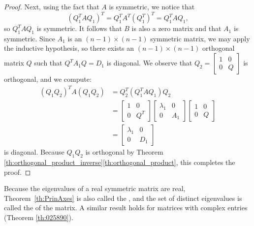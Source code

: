 \documentclass{ximera}
\begin{document}
\begin{proof}
Next, using the fact that $A$ is symmetric, we notice that
$$(Q_{1}^TAQ_{1})^T = Q_{1}^T A^T (Q_{1}^T)^T = Q_{1}^TAQ_{1},$$ so $Q_{1}^TAQ_{1}$ is symmetric.  It follows that $B$ is also a zero matrix and that $A_{1}$ is symmetric.  Since $A_{1}$ is an $(n - 1) \times (n - 1)$ symmetric matrix, we may apply the inductive hypothesis, so there exists an $(n - 1) \times (n - 1)$ orthogonal matrix $Q$ such that $Q^{T}A_{1}Q = D_{1}$ is diagonal. We observe that $Q_{2} = \begin{bmatrix}
 1 & 0\\
 0 & Q
 \end{bmatrix}$
 is orthogonal, and we compute:
\begin{align*}
(Q_{1}Q_{2})^TA(Q_{1}Q_{2}) &= Q_{2}^T(Q_{1}^TAQ_{1})Q_{2} \\
&= \begin{bmatrix}
1 & 0 \\
0 & Q^T
\end{bmatrix} \begin{bmatrix}
\lambda_{1} & 0 \\
0 & A_{1}
\end{bmatrix}\begin{bmatrix}
1 & 0 \\
0 & Q
\end{bmatrix}\\
&= \begin{bmatrix}
\lambda_{1} & 0 \\
0 & D_{1}
\end{bmatrix}
\end{align*}
is diagonal. Because $Q_{1}Q_{2}$ is orthogonal by Theorem \ref{th:orthogonal_product_inverse}\ref{th:orthogonal_product}, this completes the proof.
\end{proof}


Because the eigenvalues of a real symmetric matrix are real, Theorem~\ref{th:PrinAxes} is also called the , and the set of distinct eigenvalues is called the  of the matrix. A similar result holds for matrices with complex entries (Theorem \ref{th:025890}).
\end{document}
